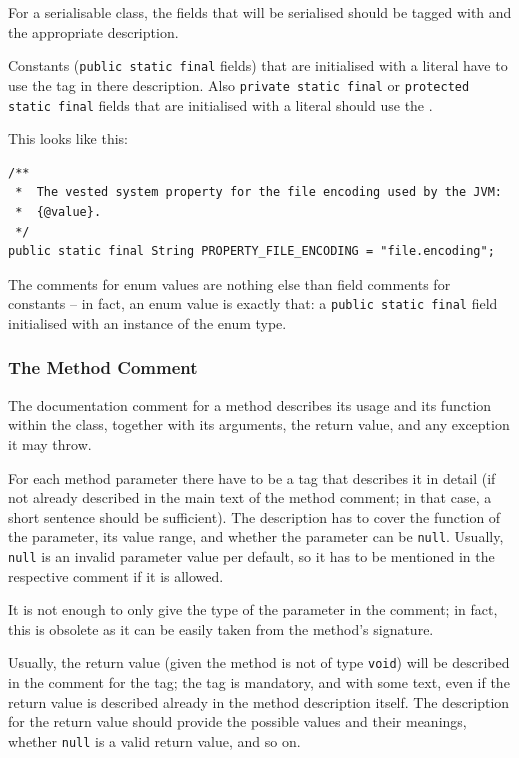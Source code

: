 \documentclass[11pt,a4paper, titlepage, parskip=half, headsepline, footsepline, cleardoublepage=current, headheight=1cm]{scrbook}
\begin{document}
For a serialisable class, the fields that will be serialised should be tagged with  and the appropriate description.

Constants (\lstinline|public static final| fields) that are initialised with a literal have to use the  tag in there description. Also \lstinline|private static final| or \lstinline|protected static final| fields that are initialised with a literal should use the .

This looks like this:
\begin{lstlisting}
/**
 *  The vested system property for the file encoding used by the JVM:
 *  {@value}.
 */
public static final String PROPERTY_FILE_ENCODING = "file.encoding";
\end{lstlisting}

The comments for enum values are nothing else than field comments for constants – in fact, an enum value is exactly that: a \lstinline|public static final| field initialised with an instance of the enum type.


\subsubsection{The Method Comment}\label{sec:MethodComment}
The documentation comment for a method describes its usage and its function within the class, together with its arguments, the return value, and any exception it may throw.

For each method parameter there have to be a  tag that describes it in detail (if not already described in the main text of the method comment; in that case, a short sentence should be sufficient). The description has to cover the function of the parameter, its value range, and whether the parameter can be \lstinline|null|. Usually, \lstinline|null| is an invalid parameter value per default, so it has to be mentioned in the respective comment if it is allowed.

It is not enough to only give the type of the parameter in the comment; in fact, this is obsolete as it can be easily taken from the method's signature.

Usually, the return value (given the method is not of type \lstinline|void|) will be described in the comment for the  tag; the tag is mandatory, and with some text, even if the return value is described already in the method description itself. The description for the return value should provide the possible values and their meanings, whether \lstinline|null| is a valid return value, and so on. 
\end{document}
